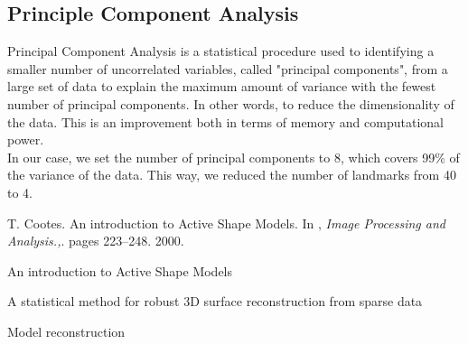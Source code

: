 \documentclass{article}
\begin{document}
\subsection{Principle Component Analysis}

Principal Component Analysis is a statistical procedure  used to identifying a smaller number of uncorrelated variables, called "principal components", from a large set of data to explain the maximum amount of variance with the fewest number of principal components. In other words, to reduce the dimensionality of the data. This is an improvement both in terms of memory and computational power.\\
In our case, we set the number of principal components to 8, which covers 99\% of the variance of the data. This way, we reduced the number of landmarks from 40 to 4.


\begin{thebibliography}{1}
T. Cootes. An introduction to Active Shape Models. In , 
\textit{Image Processing and Analysis.,}. 
pages 223–248. 2000.
 
An introduction to Active Shape Models

A statistical method for robust 3D surface reconstruction from sparse data

Model reconstruction 
% 

\end{thebibliography}
\end{document}
